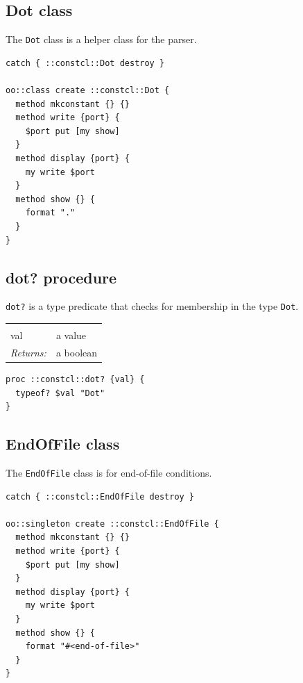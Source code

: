 \documentclass[twoside]{report}
\begin{document}
\subsection{Dot class}
\label{dot-class}

The \texttt{Dot} class is a helper class for the parser.

\begin{lstlisting}
catch { ::constcl::Dot destroy }

oo::class create ::constcl::Dot {
  method mkconstant {} {}
  method write {port} {
    $port put [my show]
  }
  method display {port} {
    my write $port
  }
  method show {} {
    format "."
  }
}
\end{lstlisting}

\subsection{dot? procedure}
\label{dot-procedure}

\texttt{dot?} is a type predicate that checks for membership in the type \texttt{Dot}.

\noindent\begin{tabular}{ |p{1.9cm} p{8cm}| }
\hline
\rowcolor[HTML]{CCCCCC} \multicolumn{2}{|l|}{\bf dot? (internal)} \\
val & a value \\
\textit{Returns:} & a boolean \\
\hline
\end{tabular}

\begin{lstlisting}
proc ::constcl::dot? {val} {
  typeof? $val "Dot"
}
\end{lstlisting}

\subsection{EndOfFile class}
\label{endoffile-class}

The \texttt{EndOfFile} class is for end-of-file conditions.

\begin{lstlisting}
catch { ::constcl::EndOfFile destroy }

oo::singleton create ::constcl::EndOfFile {
  method mkconstant {} {}
  method write {port} {
    $port put [my show]
  }
  method display {port} {
    my write $port
  }
  method show {} {
    format "#<end-of-file>"
  }
}
\end{lstlisting}
\end{document}
